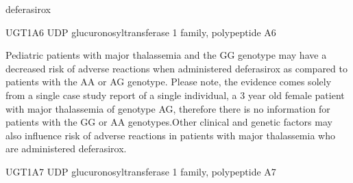 \documentclass{resume} %
\begin{document}
\begin{rSection}{ deferasirox }
\begin{rSubsection}{ UGT1A6 }{ UDP glucuronosyltransferase 1 family, polypeptide A6 }{}{}
\item[] Pediatric patients with major thalassemia and the GG genotype may have a decreased risk of adverse reactions when administered deferasirox as compared to patients with the AA or AG genotype. Please note, the evidence comes solely from a single case study report of a single individual, a 3 year old female patient with major thalassemia of genotype AG, therefore there is no information for patients with the GG or AA genotypes.Other clinical and genetic factors may also influence risk of adverse reactions in patients with major thalassemia who are administered deferasirox.
\end{rSubsection}\begin{rSubsection}{ UGT1A7 }{ UDP glucuronosyltransferase 1 family, polypeptide A7 }{}{}
\item[]


\end{rSubsection}
\end{rSection}
\end{document}

